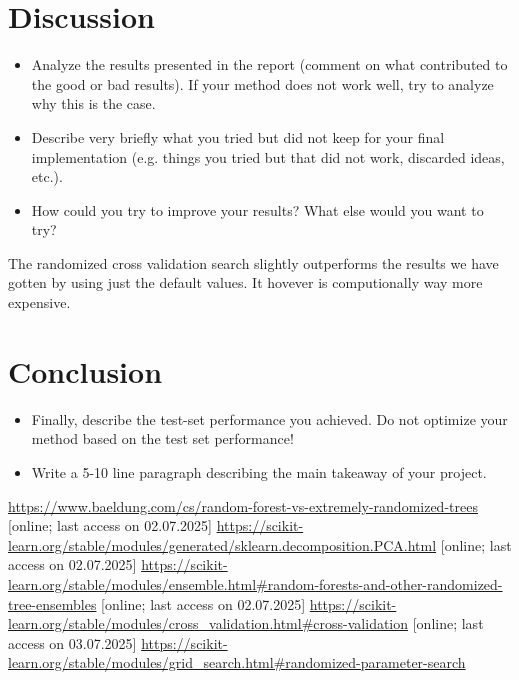 \documentclass[a4, 10 pt, conference]{ieeeconf}  %
\begin{document}
\section{Discussion}
\label{sec:discuss}

{\color{blue}
\begin{itemize}
	\item Analyze the results presented in the report (comment on what contributed to the good or bad results). If your method does not work well, try to analyze why this is the case.
	\item Describe very briefly what you tried but did not keep for your final implementation (e.g. things you tried but that did not work, discarded ideas, etc.).
	\item How could you try to improve your results? What else would you want to try?

\end{itemize}
}

The randomized cross validation search slightly outperforms the results we have gotten by using just the default values. It hovever is computionally way more expensive.

\section{Conclusion}
\label{sec:con}

{\color{blue}

  \begin{itemize}
  \item Finally, describe the test-set performance you achieved. Do not
    optimize your method based on the test set performance!
  \item Write a 5-10 line paragraph describing the main takeaway of your project.
  \end{itemize}

}

\begin{thebibliography}{xxxx}
	 \url{https://www.baeldung.com/cs/random-forest-vs-extremely-randomized-trees} [online; last access on 02.07.2025]
	 \url{https://scikit-learn.org/stable/modules/generated/sklearn.decomposition.PCA.html} [online; last access on 02.07.2025]
	 \url{https://scikit-learn.org/stable/modules/ensemble.html#random-forests-and-other-randomized-tree-ensembles} [online; last access on 02.07.2025]
	 \url{https://scikit-learn.org/stable/modules/cross_validation.html#cross-validation} [online; last access on 03.07.2025]
	 \url{https://scikit-learn.org/stable/modules/grid_search.html#randomized-parameter-search}
\end{thebibliography}
\end{document}
